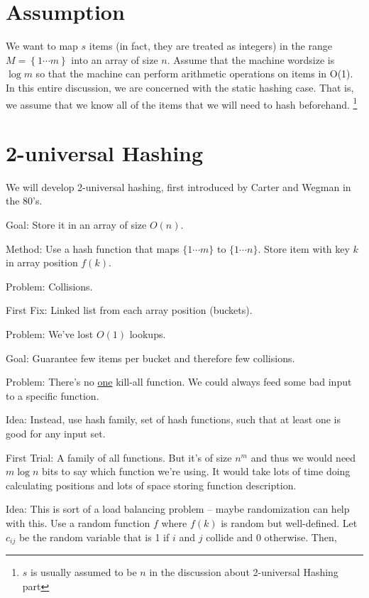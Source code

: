 \documentclass{article}
\begin{document}
\section{Assumption}

We want to map $s$ items (in fact, they are treated as integers) in the range $M = \left\{ 1 \cdots m \right\}$ into an array of size $n$.
Assume that the machine wordsize is $\log m$ so that the machine can perform arithmetic operations on items
in O(1). In this entire discussion, we are concerned with the static hashing case. That is, we assume
that we know all of the items that we will need to hash beforehand.
\footnote{$s$ is usually assumed to be $n$ in the discussion about 2-universal Hashing part}

\section{2-universal Hashing}

We will develop 2-universal hashing, first introduced by Carter and Wegman in the 80's.

Goal: Store it in an array of size $O(n)$.

Method: Use a hash function that maps $\{1 \cdots m\}$ to $\{1 \cdots n\}$.
Store item with key $k$ in array position $f(k)$.

Problem: Collisions.

First Fix: Linked list from each array position (buckets).

Problem: We've lost $O(1)$ lookups.

Goal: Guarantee few items per bucket and therefore few collisions.

Problem: There's no \underline{one} kill-all function. We could always feed some bad input to a specific function.

Idea: Instead, use hash family, set of hash functions, such that at least one is good for any input set.

First Trial: A family of all functions. But it's of size $n^m$ and thus we would need $m \log n$ bits
to say which function we're using.
It would take lots of time doing calculating positions and lots of space storing function description.

Idea: This is sort of a load balancing problem -- maybe randomization can help with this.
Use a random function $f$ where $f(k)$ is random but well-defined. 
Let $c_{ij}$ be the random variable that is 1 if $i$ and $j$ collide and 0 otherwise. Then,
\end{document}
